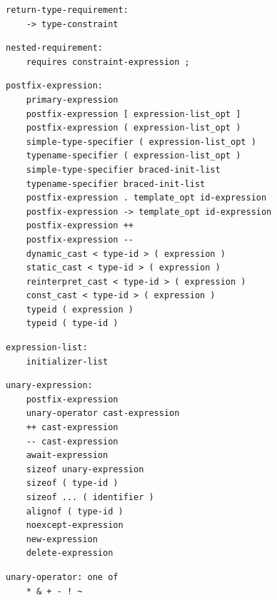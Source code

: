 \noindent\textbf{\texttt{}}\par
\begin{lstlisting}
return-type-requirement:
    -> type-constraint
\end{lstlisting}

\noindent\textbf{\texttt{}}\par
\begin{lstlisting}
nested-requirement:
    requires constraint-expression ;
\end{lstlisting}

\noindent\textbf{\texttt{}}\par
\begin{lstlisting}
postfix-expression:
    primary-expression
    postfix-expression [ expression-list_opt ]
    postfix-expression ( expression-list_opt )
    simple-type-specifier ( expression-list_opt )
    typename-specifier ( expression-list_opt )
    simple-type-specifier braced-init-list
    typename-specifier braced-init-list
    postfix-expression . template_opt id-expression
    postfix-expression -> template_opt id-expression
    postfix-expression ++
    postfix-expression --
    dynamic_cast < type-id > ( expression )
    static_cast < type-id > ( expression )
    reinterpret_cast < type-id > ( expression )
    const_cast < type-id > ( expression )
    typeid ( expression )
    typeid ( type-id )
\end{lstlisting}

\noindent\textbf{\texttt{}}\par
\begin{lstlisting}
expression-list:
    initializer-list
\end{lstlisting}

\noindent\textbf{\texttt{}}\par
\begin{lstlisting}
unary-expression:
    postfix-expression
    unary-operator cast-expression
    ++ cast-expression
    -- cast-expression
    await-expression
    sizeof unary-expression
    sizeof ( type-id )
    sizeof ... ( identifier )
    alignof ( type-id )
    noexcept-expression
    new-expression
    delete-expression
\end{lstlisting}

\noindent\textbf{\texttt{}}\par
\begin{lstlisting}
unary-operator: one of
    * & + - ! ~
\end{lstlisting}

